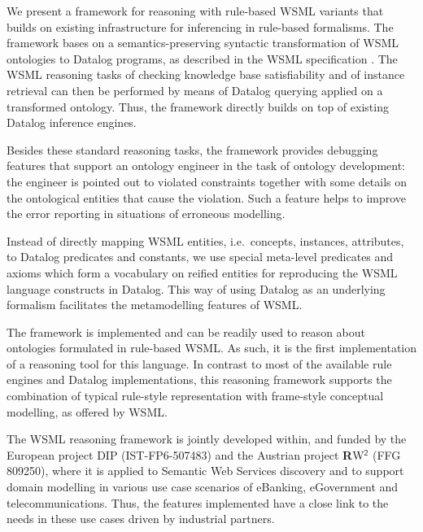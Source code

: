 \smallskip

We present a framework for reasoning with rule-based WSML variants
that builds on existing infrastructure for inferencing in
rule-based formalisms. The framework bases on a
semantics-preserving syntactic transformation of WSML ontologies
to Datalog programs, as described in the WSML specification
\cite{wsml-spec}. The WSML reasoning tasks of checking knowledge
base satisfiability and of instance retrieval can then be
performed by means of Datalog querying applied on a transformed
ontology. Thus, the framework directly builds on top of existing
Datalog inference engines.

Besides these standard reasoning tasks, the framework provides
debugging features that support an ontology engineer in the task
of ontology development: the engineer is pointed out to violated
constraints together with some details on the ontological entities
that cause the violation. Such a feature helps to improve the
error reporting in situations of erroneous modelling.

Instead of directly mapping WSML entities, i.e.\ concepts,
instances, attributes, to Datalog predicates and constants, we use
special meta-level predicates and axioms which form a vocabulary
on reified entities for reproducing the WSML language constructs
in Datalog. This way of using Datalog as an underlying formalism
facilitates the metamodelling features of WSML.

\smallskip

The framework is implemented and can be readily used to reason
about ontologies formulated in rule-based WSML. As such, it is the
first implementation of a reasoning tool for this language. In
contrast to most of the available rule engines and Datalog
implementations, this reasoning framework supports the combination
of typical rule-style representation with frame-style conceptual
modelling, as offered by WSML.

The WSML reasoning framework is jointly developed within, and
funded by the European project DIP (IST-FP6-507483) and the
Austrian project {\bfseries R}W$^{\mathsf{2}}$ (FFG 809250), where
it is applied to Semantic Web Services discovery and to support
domain modelling in various use case scenarios of eBanking,
eGovernment and telecommunications. Thus, the features implemented
have a close link to the needs in these use cases driven by
industrial partners.
